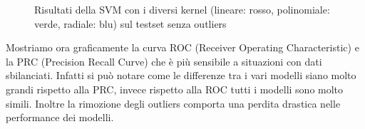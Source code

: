 \begin{figure}[H]
    \centering

    \quad

    \label{fig:measures_svm}
    \caption{Risultati della SVM con i diversi kernel (lineare: rosso, polinomiale: verde, radiale: blu) sul testset senza outliers}
\end{figure}

\noindent
Mostriamo ora graficamente la curva ROC (Receiver Operating Characteristic) e la PRC (Precision Recall Curve) che è più sensibile a situazioni con dati sbilanciati.
Infatti si può notare come le differenze tra i vari modelli siano molto grandi rispetto alla PRC, invece rispetto alla ROC tutti i modelli sono molto simili.
Inoltre la rimozione degli outliers comporta una perdita drastica nelle performance dei modelli.

